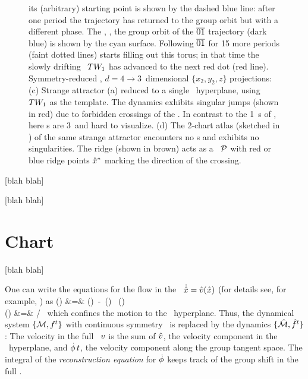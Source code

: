 \documentclass[aip,cha,reprint,
secnumarabic,
nofootinbib, tightenlines,
nobibnotes, showkeys, showpacs,
groupedaddress
]{revtex4-1}
\begin{document}
\begin{figure}
{  its (arbitrary) starting point is shown by the dashed blue line: after
  one period the trajectory has returned to the group orbit but with a
  different phase. The \wurst, \ie, the group orbit of the $\overline{01}$
  trajectory (dark blue) is shown by the cyan surface. Following
  $\overline{01}$ for 15 more periods (faint dotted lines) starts filling
  out this torus; in that time the slowly drifting \reqv\ $TW_{1}$
  has advanced to the next red dot (red line).
Symmetry-reduced \cLf, $d=4 \to 3$~dimensional $\{x_2,y_2,z\}$ projections:
 (c)
 Strange attractor (a) reduced to a single \slice\ hyperplane, using
 $TW_{1}$ as the template. The dynamics exhibits singular jumps
 (shown in red) due to forbidden crossings of the \chartBord. In contrast
 to the 1\dmn\ \poincBord s of , here \chartBord s
 are 3\dmn\ and hard to visualize.
 (d)
The 2-chart atlas (sketched in ) of the same
strange attractor encounters no \chartBord s and exhibits no
singularities. The ridge (shown in brown) acts as a \PoincSec\ ${\cal P}$ with red or
blue ridge points $\hat{x}^*$ marking the direction of the crossing.
  }
\label{fig:CLf01group}
\end{figure}

 [blah blah]

 [blah blah]

\section{Chart}
\label{s:slice}

 [blah blah]

One can write the equations for the flow in the \reducedsp\
$\dot{\hat{x}} = \hat{v}(\hat{x})$ (for details see, for example,
\refref{DasBuch}) as
\bea
\velRed(\sspRed) &=& \vel(\sspRed)
     \,-\, \dot{\gSpace}(\sspRed) \, \groupTan(\sspRed)
\label{2modesEqMotMFrame}\\
\dot{\gSpace}(\sspRed) &=& \braket{\vel(\sspRed)}{\sliceTan{}}
                       /\braket{\groupTan(\sspRed)}{\sliceTan{}}
\,
\label{2modesreconstrEq}
\eea
which confines the motion to the \slice\ hyperplane. Thus, the dynamical
system $\{{\cal M},f^t\}$ with continuous symmetry \Group\ is replaced by
the {\reducedsp} dynamics $\{\hat{\cal M},\hat{f}^t\}$: The velocity in the
full \statesp\ $v$ is the sum of $\hat{v}$, the velocity component in
the \slice\ hyperplane, and $\dot{{\bf \phi}}\,t$, the velocity
component along the group tangent space. The integral of the {\em
reconstruction equation} for $\dot{{\bf \phi}}$ keeps track of the group
shift in the full \statesp.
\end{document}
